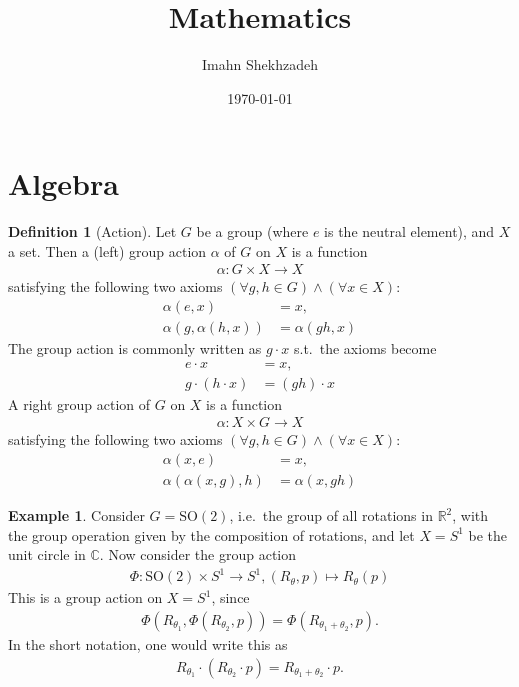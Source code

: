 \documentclass[12pt, a4paper]{article}
\title{Mathematics}
\author{Imahn Shekhzadeh}
\date{\today}
\numberwithin{equation}{section}
\theoremstyle{definition}
\theoremstyle{definition}
\newtheorem{defn}[thm]{Definition} %
\newtheorem{exmp}[thm]{Example} %
\begin{document}
	\maketitle
	\tableofcontents
	\newpage 
	
	\section{Algebra}
	
	\begin{defn}[Action]\label{defn:algebra__group_action}
		Let $G$ be a group (where $e$ is the neutral element), and $X$ a set. Then a (left) group action $\alpha$ of $G$ on $X$ is a function
		\begin{align}
			\alpha: G\times X \rightarrow X
		\end{align}
		satisfying the following two axioms $(\forall g, h\in G) \wedge (\forall x\in X)$:
		\begin{align*}
			\alpha(e, x) &= x, 
			\\ \alpha(g, \alpha(h, x)) &= \alpha(gh, x)
		\end{align*}
		The group action is commonly written as $g\cdot x$ s.t.~the axioms become
		\begin{align}\label{eqn:left__group_action}
			e\cdot x &= x, 
			\\ g\cdot \left(h\cdot x\right) &= \left(gh\right)\cdot x
		\end{align}
		A right group action of $G$ on $X$ is a function
		\begin{align}
			\alpha: X\times G \rightarrow X
		\end{align}
		satisfying the following two axioms $(\forall g, h\in G) \wedge (\forall x\in X)$:
		\begin{align}
			\alpha(x, e) &= x, 
			\\ \alpha(\alpha(x, g), h) &= \alpha(x, gh)
		\end{align}
	\end{defn}
	
	\begin{exmp}
		Consider $G = \text{SO}(2)$, i.e.~the group of all rotations in $\mathbb R^2$, with the group operation given by the composition of rotations, and let $X = S^1$ be the unit circle in $\mathbb C$. Now consider the group action
		\begin{align}
			\Phi:\text{SO}(2) \times S^{1} \rightarrow S^{1}, (R_{\theta}, p) \mapsto R_{\theta}(p)
		\end{align}
		This is a group action on $X = S^{1}$, since 
		\begin{align*}
			\Phi(R_{\theta_1}, \Phi(R_{\theta_2}, p)) = \Phi(R_{\theta_1 + \theta_2}, p).
		\end{align*}
		In the short notation, one would write this as
		\begin{align*}
			R_{\theta_1}\cdot \left( R_{\theta_2} \cdot p \right) = R_{\theta_1 + \theta_2} \cdot p.
		\end{align*}
	\end{exmp}
	
\end{document}
